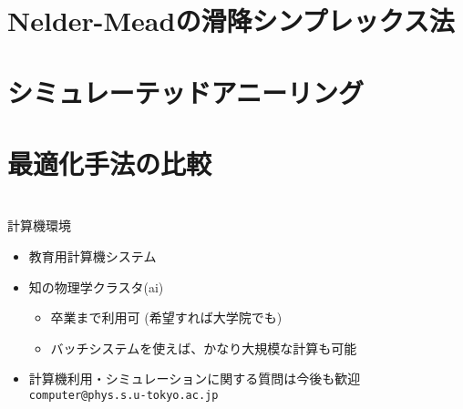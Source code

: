 \documentclass[10pt,dvipdfmx]{beamer}
\begin{document}
\section{Nelder-Meadの滑降シンプレックス法}





\section{シミュレーテッドアニーリング}







\section{最適化手法の比較}








\section{}

\begin{frame}[t,fragile]{計算機環境}
  \begin{itemize}
  \item 教育用計算機システム
  \item 知の物理学クラスタ(ai)
    \begin{itemize}
    \item 卒業まで利用可 (希望すれば大学院でも)
    \item バッチシステムを使えば、かなり大規模な計算も可能
    \end{itemize}
  \item 計算機利用・シミュレーションに関する質問は今後も歓迎 {\tt computer@phys.s.u-tokyo.ac.jp}
  \end{itemize}
\end{frame}
\end{document}
